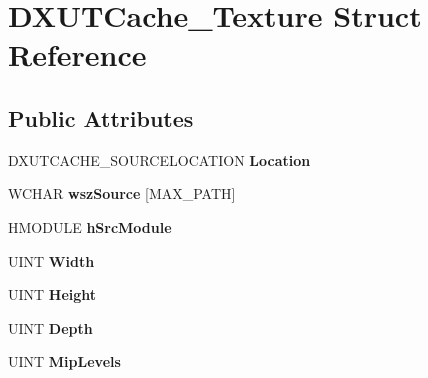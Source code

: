 \hypertarget{struct_d_x_u_t_cache___texture}{\section{D\+X\+U\+T\+Cache\+\_\+\+Texture Struct Reference}
\label{struct_d_x_u_t_cache___texture}
}
\subsection*{Public Attributes}
\begin{DoxyCompactItemize}
\item 
\hypertarget{struct_d_x_u_t_cache___texture_a6c3eaa5b8daece02e1d6dd7d25c5b07b}{D\+X\+U\+T\+C\+A\+C\+H\+E\+\_\+\+S\+O\+U\+R\+C\+E\+L\+O\+C\+A\+T\+I\+O\+N {\bfseries Location}}\label{struct_d_x_u_t_cache___texture_a6c3eaa5b8daece02e1d6dd7d25c5b07b}

\item 
\hypertarget{struct_d_x_u_t_cache___texture_a2ef863de08edcc49d9b0c860a72105b7}{W\+C\+H\+A\+R {\bfseries wsz\+Source} \mbox{[}M\+A\+X\+\_\+\+P\+A\+T\+H\mbox{]}}\label{struct_d_x_u_t_cache___texture_a2ef863de08edcc49d9b0c860a72105b7}

\item 
\hypertarget{struct_d_x_u_t_cache___texture_a07369d4ea106a4a0780c81e8e6c4d7be}{H\+M\+O\+D\+U\+L\+E {\bfseries h\+Src\+Module}}\label{struct_d_x_u_t_cache___texture_a07369d4ea106a4a0780c81e8e6c4d7be}

\item 
\hypertarget{struct_d_x_u_t_cache___texture_a6d09b8c5fda282163eae7f42f9a3b0b9}{U\+I\+N\+T {\bfseries Width}}\label{struct_d_x_u_t_cache___texture_a6d09b8c5fda282163eae7f42f9a3b0b9}

\item 
\hypertarget{struct_d_x_u_t_cache___texture_a83b1f09e46adc2179ce422afe4221554}{U\+I\+N\+T {\bfseries Height}}\label{struct_d_x_u_t_cache___texture_a83b1f09e46adc2179ce422afe4221554}

\item 
\hypertarget{struct_d_x_u_t_cache___texture_a0ee63f98691312bf1da4d84196192a4c}{U\+I\+N\+T {\bfseries Depth}}\label{struct_d_x_u_t_cache___texture_a0ee63f98691312bf1da4d84196192a4c}

\item 
\hypertarget{struct_d_x_u_t_cache___texture_a74815def3a731c1f8f91671d2911da56}{U\+I\+N\+T {\bfseries Mip\+Levels}}\label{struct_d_x_u_t_cache___texture_a74815def3a731c1f8f91671d2911da56}


\end{DoxyCompactItemize}

